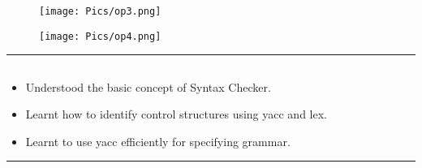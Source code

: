 \documentclass[12pt,letterpaper]{article}
\begin{document}
\newpage
\subsubsection*{}
\begin{figure}[h]
    \centering
    \texttt{[image: Pics/op3.png]}
\end{figure}
\begin{figure}[h]
    \centering
    \texttt{[image: Pics/op4.png]}
\end{figure}
\hrule
\subsection*{}
\begin{flushleft}
    \renewcommand{\labelitemi}{$\textendash$}
    \begin{itemize}
        \item Understood the basic concept of Syntax Checker. 
        \item Learnt how to identify control structures using yacc and lex.
        \item Learnt to use yacc efficiently for specifying grammar.
    \end{itemize}
\end{flushleft}
\hrule
\end{document}
